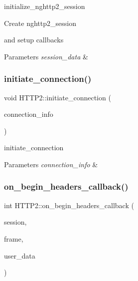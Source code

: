 initialize\+\_\+nghttp2\+\_\+session 

Create nghttp2\+\_\+session

and setup callbacks 
\begin{DoxyParams}{Parameters}
{\em session\+\_\+data} & \\
\hline
\end{DoxyParams}
\mbox{\label{classhttp2_1_1HTTP2_a351a2726e2b53ab6ac19995ea18e98e1}} 
\subsubsection{\texorpdfstring{initiate\+\_\+connection()}{initiate\_connection()}}
{\footnotesize\ttfamily void H\+T\+T\+P2\+::initiate\+\_\+connection (\begin{DoxyParamCaption}\item[{\hyperlink{classhttp2_1_1HTTP2ConnectionInfo}{H\+T\+T\+P2\+Connection\+Info} $\ast$}]{connection\+\_\+info }\end{DoxyParamCaption})\hspace{0.3cm}{\ttfamily [static]}}



initiate\+\_\+connection 


\begin{DoxyParams}{Parameters}
{\em connection\+\_\+info} & \\
\hline
\end{DoxyParams}
\mbox{\label{classhttp2_1_1HTTP2_af1c5f64ae30280b9c061ff646eb39b31}} 
\subsubsection{\texorpdfstring{on\+\_\+begin\+\_\+headers\+\_\+callback()}{on\_begin\_headers\_callback()}}
{\footnotesize\ttfamily int H\+T\+T\+P2\+::on\+\_\+begin\+\_\+headers\+\_\+callback (\begin{DoxyParamCaption}\item[{nghttp2\+\_\+session $\ast$}]{session,  }\item[{const nghttp2\+\_\+frame $\ast$}]{frame,  }\item[{void $\ast$}]{user\+\_\+data }\end{DoxyParamCaption})\hspace{0.3cm}{\ttfamily [static]}}



